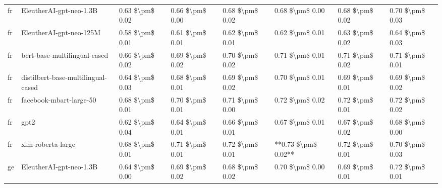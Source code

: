 \begin{tabular}{llllllll}
      fr &            EleutherAI-gpt-neo-1.3B & 0.63 \$\textbackslash pm\$ 0.02 &           0.66 \$\textbackslash pm\$ 0.00 &       0.68 \$\textbackslash pm\$ 0.02 &        0.68 \$\textbackslash pm\$ 0.00 &                         0.68 \$\textbackslash pm\$ 0.02 &     0.70 \$\textbackslash pm\$ 0.03 \\
      fr &            EleutherAI-gpt-neo-125M & 0.58 \$\textbackslash pm\$ 0.01 &           0.61 \$\textbackslash pm\$ 0.01 &       0.62 \$\textbackslash pm\$ 0.01 &        0.62 \$\textbackslash pm\$ 0.01 &                         0.63 \$\textbackslash pm\$ 0.02 &     0.64 \$\textbackslash pm\$ 0.03 \\
      fr &       bert-base-multilingual-cased & 0.66 \$\textbackslash pm\$ 0.02 &           0.69 \$\textbackslash pm\$ 0.02 &       0.70 \$\textbackslash pm\$ 0.02 &        0.71 \$\textbackslash pm\$ 0.01 &                         0.71 \$\textbackslash pm\$ 0.02 &     0.71 \$\textbackslash pm\$ 0.01 \\
      fr & distilbert-base-multilingual-cased & 0.64 \$\textbackslash pm\$ 0.03 &           0.68 \$\textbackslash pm\$ 0.01 &       0.69 \$\textbackslash pm\$ 0.02 &        0.70 \$\textbackslash pm\$ 0.01 &                         0.69 \$\textbackslash pm\$ 0.01 &     0.69 \$\textbackslash pm\$ 0.02 \\
      fr &            facebook-mbart-large-50 & 0.68 \$\textbackslash pm\$ 0.01 &           0.70 \$\textbackslash pm\$ 0.01 &       0.71 \$\textbackslash pm\$ 0.00 &        0.72 \$\textbackslash pm\$ 0.02 &                         0.72 \$\textbackslash pm\$ 0.01 &     0.72 \$\textbackslash pm\$ 0.02 \\
      fr &                               gpt2 & 0.62 \$\textbackslash pm\$ 0.04 &           0.64 \$\textbackslash pm\$ 0.01 &       0.66 \$\textbackslash pm\$ 0.01 &        0.67 \$\textbackslash pm\$ 0.01 &                         0.67 \$\textbackslash pm\$ 0.02 &     0.68 \$\textbackslash pm\$ 0.00 \\
      fr &                  xlm-roberta-large & 0.68 \$\textbackslash pm\$ 0.01 &           0.71 \$\textbackslash pm\$ 0.01 &       0.72 \$\textbackslash pm\$ 0.01 &    **0.73 \$\textbackslash pm\$ 0.02** &                         0.72 \$\textbackslash pm\$ 0.01 &     0.70 \$\textbackslash pm\$ 0.03 \\
      ge &            EleutherAI-gpt-neo-1.3B & 0.64 \$\textbackslash pm\$ 0.00 &           0.69 \$\textbackslash pm\$ 0.02 &       0.68 \$\textbackslash pm\$ 0.02 &        0.70 \$\textbackslash pm\$ 0.00 &                         0.69 \$\textbackslash pm\$ 0.01 &     0.72 \$\textbackslash pm\$ 0.01 \\

\end{tabular}
